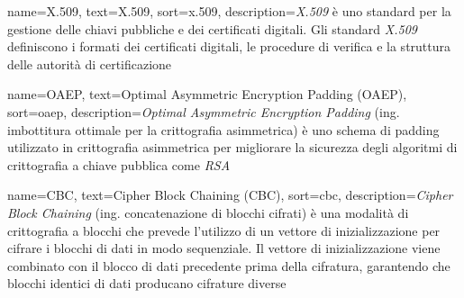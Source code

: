  {
    name=X.509,
    text=X.509,
    sort=x.509,
    description={\emph{X.509} è uno standard per la gestione delle chiavi pubbliche e dei certificati digitali. Gli standard \emph{X.509} definiscono i formati dei certificati digitali, le procedure di verifica e la struttura delle autorità di certificazione}
}

 {
    name=OAEP,
    text=Optimal Asymmetric Encryption Padding (OAEP),
    sort=oaep,
    description={\emph{Optimal Asymmetric Encryption Padding} (ing. imbottitura ottimale per la crittografia asimmetrica) è uno schema di padding utilizzato in crittografia asimmetrica per migliorare la sicurezza degli algoritmi di crittografia a chiave pubblica come \emph{RSA}}
}

 {
    name=CBC,
    text=Cipher Block Chaining (CBC),
    sort=cbc,
    description={\emph{Cipher Block Chaining} (ing. concatenazione di blocchi cifrati) è una modalità di crittografia a blocchi che prevede l'utilizzo di un vettore di inizializzazione per cifrare i blocchi di dati in modo sequenziale. Il vettore di inizializzazione viene combinato con il blocco di dati precedente prima della cifratura, garantendo che blocchi identici di dati producano cifrature diverse}
}